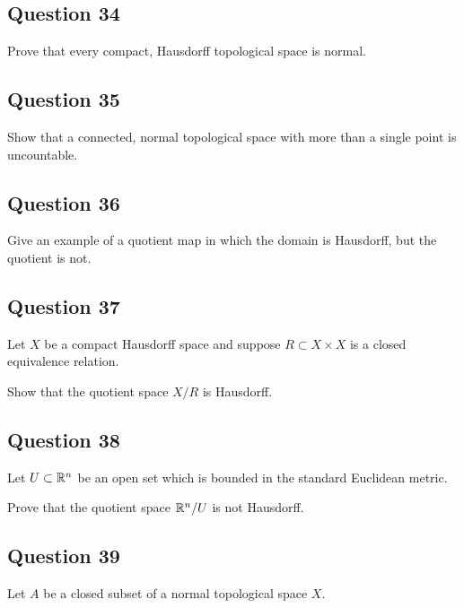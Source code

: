 \documentclass[12pt]{article}
\begin{document}
\hypertarget{question-34-3}{%
\subsection{Question 34}\label{question-34-3}}

Prove that every compact, Hausdorff topological space is normal.

\hypertarget{question-35-3}{%
\subsection{Question 35}\label{question-35-3}}

Show that a connected, normal topological space with more than a single
point is uncountable.

\hypertarget{question-36-3}{%
\subsection{Question 36}\label{question-36-3}}

Give an example of a quotient map in which the domain is Hausdorff, but
the quotient is not.

\hypertarget{question-37-3}{%
\subsection{Question 37}\label{question-37-3}}

Let \(X\) be a compact Hausdorff space and suppose
\(R \subset X \times X\) is a closed equivalence relation.

Show that the quotient space \(X/R\) is Hausdorff.

\hypertarget{question-38-3}{%
\subsection{Question 38}\label{question-38-3}}

Let \(U \subset {\mathbb{R}}^n\) be an open set which is bounded in the standard
Euclidean metric.

Prove that the quotient space \({\mathbb{R}}^n / U\) is not Hausdorff.

\hypertarget{question-39-3}{%
\subsection{Question 39}\label{question-39-3}}

Let \(A\) be a closed subset of a normal topological space \(X\).
\end{document}
